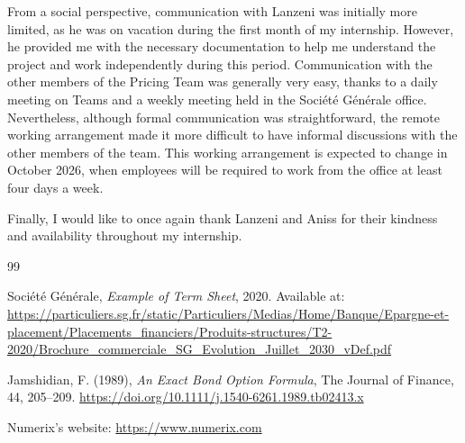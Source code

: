 \documentclass{article}
\begin{document}
From a social perspective, communication with Lanzeni was initially more limited, as he was on vacation during the first month of my internship. However, he provided me with the necessary documentation to help me understand the project and work independently during this period. Communication with the other members of the Pricing Team was generally very easy, thanks to a daily meeting on Teams and a weekly meeting held in the Société Générale office. Nevertheless, although formal communication was straightforward, the remote working arrangement made it more difficult to have informal discussions with the other members of the team. This working arrangement is expected to change in October 2026, when employees will be required to work from the office at least four days a week.

Finally, I would like to once again thank Lanzeni and Aniss for their kindness and availability throughout my internship.

\clearpage
\begin{thebibliography}{99}

Société Générale, 
\textit{Example of Term Sheet}, 
2020. 
Available at: 
\url{https://particuliers.sg.fr/static/Particuliers/Medias/Home/Banque/Epargne-et-placement/Placements_financiers/Produits-structures/T2-2020/Brochure_commerciale_SG_Evolution_Juillet_2030_vDef.pdf}

Jamshidian, F. (1989),
\textit{An Exact Bond Option Formula},
The Journal of Finance, 44, 205--209.
\url{https://doi.org/10.1111/j.1540-6261.1989.tb02413.x}

Numerix's website: 
\url{https://www.numerix.com}

\end{thebibliography}
\end{document}
